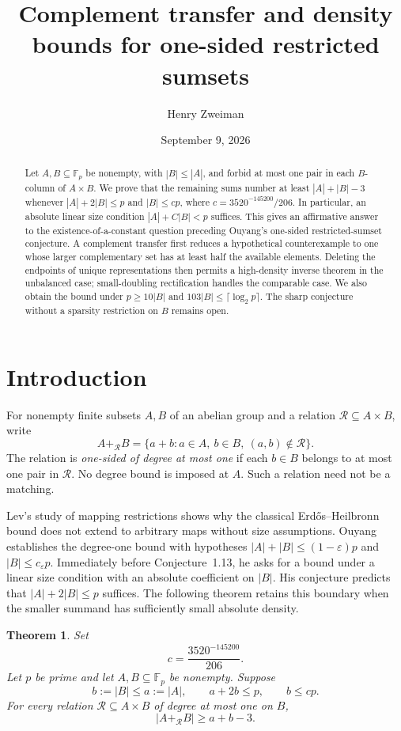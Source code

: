 \documentclass[11pt]{article}
\title{Complement transfer and density bounds for one-sided restricted sumsets}
\author{Henry Zweiman}
\date{September 9, 2026}
\newtheorem{theorem}{Theorem}
\theoremstyle{remark}
\newcommand{\F}{\mathbb F}
\newcommand{\rs}{+_{\mathcal R}}
\begin{document}
\maketitle
\begin{abstract}
Let $A,B\subseteq\F_p$ be nonempty, with $|B|\le |A|$, and forbid at most one pair in each $B$-column of $A\times B$. We prove that the remaining sums number at least $|A|+|B|-3$ whenever $|A|+2|B|\le p$ and $|B|\le cp$, where $c=3520^{-145200}/206$. In particular, an absolute linear size condition $|A|+C|B|<p$ suffices. This gives an affirmative answer to the existence-of-a-constant question preceding Ouyang's one-sided restricted-sumset conjecture. A complement transfer first reduces a hypothetical counterexample to one whose larger complementary set has at least half the available elements. Deleting the endpoints of unique representations then permits a high-density inverse theorem in the unbalanced case; small-doubling rectification handles the comparable case. We also obtain the bound under $p\ge10|B|$ and $103|B|\le\lceil\log_2p\rceil$. The sharp conjecture without a sparsity restriction on $B$ remains open.
\end{abstract}

\section{Introduction}
For nonempty finite subsets $A,B$ of an abelian group and a relation $\mathcal R\subseteq A\times B$, write
\[
 A\rs B=\{a+b:a\in A,\ b\in B,\ (a,b)\notin\mathcal R\}.
\]
The relation is \emph{one-sided of degree at most one} if each $b\in B$ belongs to at most one pair in $\mathcal R$. No degree bound is imposed at $A$. Such a relation need not be a matching.

Lev's study of mapping restrictions \cite{Lev2000} shows why the classical Erd\H{o}s--Heilbronn bound does not extend to arbitrary maps without size assumptions. Ouyang \cite{Ouyang} establishes the degree-one bound with hypotheses $|A|+|B|\le(1-\varepsilon)p$ and $|B|\le c_\varepsilon p$. Immediately before Conjecture~1.13, he asks for a bound under a linear size condition with an absolute coefficient on $|B|$. His conjecture predicts that $|A|+2|B|\le p$ suffices. The following theorem retains this boundary when the smaller summand has sufficiently small absolute density.

\begin{theorem}\label{thm:density}
Set
\[
 c=\frac{3520^{-145200}}{206}.
\]
Let $p$ be prime and let $A,B\subseteq\F_p$ be nonempty. Suppose
\[
 b:=|B|\le a:=|A|,\qquad a+2b\le p,\qquad b\le cp.
\]
For every relation $\mathcal R\subseteq A\times B$ of degree at most one on $B$,
\[
 |A\rs B|\ge a+b-3.
\]
\end{theorem}
\end{document}
